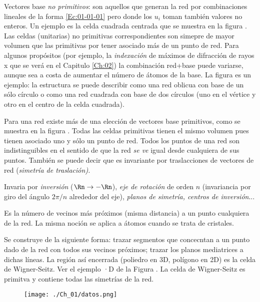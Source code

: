 \begin{definition}
    Vectores base {\it no primitivos}: son aquellos que generan la red por combinaciones lineales de la forma \ref{Ec:01-01-01} pero donde los $u_i$ toman también valores no enteros. Un ejemplo es la celda cuadrada centrada que se muestra en la figura . Las celdas (unitarias) no primitivas correspondientes son simepre de mayor volumen que las primitivas por tener asociado más de un punto de red. Para algunos propósitos (por ejemplo, la {\it indexación} de máximos de difracción de rayos x que se verá en el Capitulo \ref{Ch:02}) la combinación red+base puede variarse, aunque sea a costa de aumentar el número de átomos de la base. La figura es un ejemplo: la estructura se puede describir como una red oblicua con base de un sólo círculo o como una red cuadrada con base de dos círculos (uno en el vértice y otro en el centro de la celda cuadrada).
\end{definition}

\begin{definition}
    Para una red existe más de una elección de vectores base primitivos, como se muestra en la figura . Todas las celdas primitivas tienen el mismo volumen pues tienen asociado uno y sólo un punto de red. Todos los puntos de una red son indistinguibles en el sentido de que la red {\it se ve} igual desde cualquiera de sus puntos. También se puede decir que es invariante por traslacciones de vectores de red (\it{simetría de traslación}).          
\end{definition}

\begin{definition}
    Invaria por {\it inversión} ($\Rn \rightarrow - \Rn$), {\it eje de rotación} de orden $n$ (invariancia por giro del ángulo $2\pi/n$ alrededor del eje), {\it planos de simetría, centros de inversión}...    
\end{definition}

\begin{definition}
    Es la número de vecinos más próximos (misma distancia) a un punto cualquiera de la red. La misma noción se aplica a átomos cuando se trata de cristales.
\end{definition}

\begin{definition}
    Se construye de la siguiente forma: trazar segmentos que concecntan a un punto dado de la red con todos sus vecinos próximos; trazar los planos mediatrices a dichas líneas. La región así encerrada (poliedro en 3D, polígono en 2D) es la celda de Wigner-Seitz. Ver el ejemplo ·D de la Figura  . La celda de Wigner-Seitz es primitva y contiene todas las simetrías de la red.    
\end{definition}

\begin{figure}[h!] \centering
    \texttt{[image: ./Ch\_01/datos.png]}
\end{figure}

